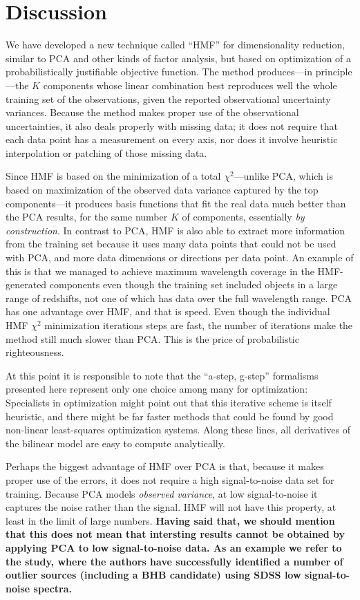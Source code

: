 \documentclass[12pt,preprint]{aastex}
\begin{document}
\section{Discussion}\label{sec:discussion}
We have developed a new technique called ``HMF'' for dimensionality
reduction, similar to PCA and other kinds of factor analysis, but
based on optimization of a probabilistically justifiable objective
function.  The method produces---in principle---the $K$ components
whose linear combination best reproduces well the whole training set
of the observations, given the reported observational uncertainty
variances.  Because the method makes proper use of the observational
uncertainties, it also deals properly with missing data; it does not
require that each data point has a measurement on every axis, nor does
it involve heuristic interpolation or patching of those missing data.

Since HMF is based on the minimization of a total $\chi^2$---unlike
PCA, which is based on maximization of the observed data variance
captured by the top components---it produces basis functions that fit
the real data much better than the PCA results, for the same number
$K$ of components, essentially \emph{by construction}.  In contrast to PCA,
HMF is also able to extract more information from the training set
because it uses many data points that could not be used with PCA, and
more data dimensions or directions per data point. An example of this
is that we managed to achieve maximum wavelength coverage in the
HMF-generated components even though the training set included objects
in a large range of redshifts, not one of which has data over the full
wavelength range.  PCA has one advantage over HMF, and that is
speed. Even though the individual HMF $\chi^2$ minimization iterations
steps are fast, the number of iterations make the method still much
slower than PCA. This is the price of probabilistic righteousness.

At this point it is responsible to note that the ``a-step, g-step''
formalisms presented here represent only one choice among many for
optimization: Specialists in optimization might point out that this
iterative scheme is itself heuristic, and there might be far faster
methods that could be found by good non-linear least-squares
optimization systems.  Along these lines, all derivatives of the
bilinear model are easy to compute analytically.

Perhaps the biggest advantage of HMF over PCA is that, because it
makes proper use of the errors, it does not require a high
signal-to-noise data set for training.  Because PCA models
\emph{observed variance}, at low signal-to-noise it captures the noise
rather than the signal.  HMF will not have this property, at least in
the limit of large numbers. \textbf{Having said that, we should mention 
that this does not mean that intersting results cannot be obtained by 
applying PCA to low signal-to-noise data. As an example we refer to the 
\citet{borosona} study, where the authors have successfully identified a 
number of outlier sources (including a BHB candidate) using SDSS low 
signal-to-noise spectra.}
\end{document}

